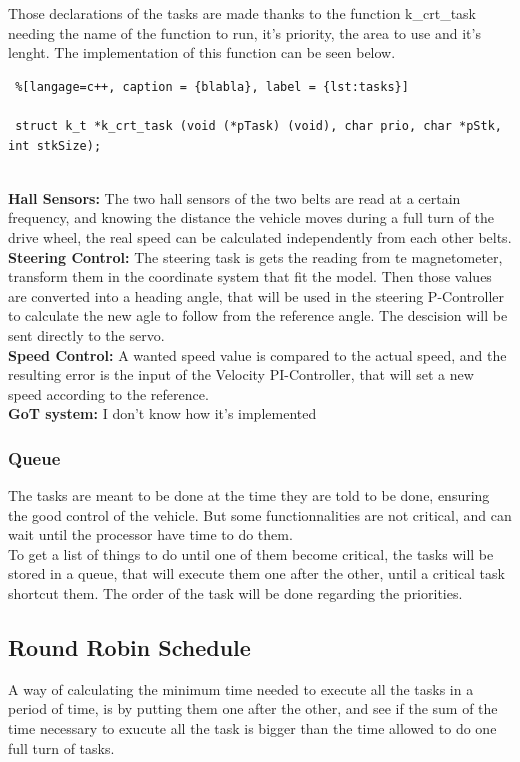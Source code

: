 Those declarations of the tasks are made thanks to the function k\_crt\_task needing the name of the function to run, it's priority, the area to use and it's lenght. The implementation of this function can be seen below.


\begin{lstlisting} %[langage=c++, caption = {blabla}, label = {lst:tasks}]

 struct k_t *k_crt_task (void (*pTask) (void), char prio, char *pStk, int stkSize);
 
\end{lstlisting}

\textbf{Hall Sensors:}
The two hall sensors of the two belts are read at a certain frequency, and knowing the distance the vehicle moves during a full turn of the drive wheel, the real speed can be calculated independently from each other belts.\\

\textbf{Steering Control:}
The steering task is gets the reading from te magnetometer, transform them in the coordinate system that fit the model. Then those values are converted into a heading angle, that will be used in the steering P-Controller to calculate the new agle to follow from the reference angle. The descision will be sent directly to the servo.\\

\textbf{Speed Control:}
A wanted speed value is compared to the actual speed, and the resulting error is the input of the Velocity PI-Controller, that will set a new speed according to the reference.\\

\textbf{GoT system:}
I don't know how it's implemented



\subsubsection{Queue}
The tasks are meant to be done at the time they are told to be done, ensuring the good control of the vehicle. But some functionnalities are not critical, and can wait until the processor have time to do them.\\
To get a list of things to do until one of them become critical, the tasks will be stored in a queue, that will execute them one after the other, until a critical task shortcut them. The order of the task will be done regarding the priorities.


\subsection{Round Robin Schedule}
A way of calculating the minimum time needed to execute all the tasks in a period of time, is by putting them one after the other, and see if the sum of the time necessary to exucute all the task is bigger than the time allowed to do one full turn of tasks.

